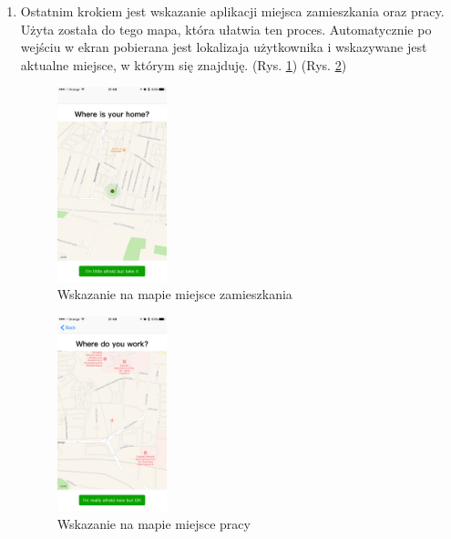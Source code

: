 \documentclass[a4paper,11pt]{article}
\begin{document}
\begin{enumerate}
\item Ostatnim krokiem jest wskazanie aplikacji miejsca zamieszkania oraz pracy. Użyta została do tego mapa, która ułatwia ten proces. Automatycznie po wejściu w ekran pobierana jest lokalizaja użytkownika i wskazywane jest aktualne miejsce, w którym się znajduję. (Rys. \ref{setup5}) (Rys. \ref{setup6})
\begin{figure}[H]
	\includegraphics[width=0.3\textwidth,center]{ios-screens/setup5.png}
	\caption {Wskazanie na mapie miejsce zamieszkania}
	\label{setup5}
\end{figure}
\begin{figure}[H]
	\includegraphics[width=0.3\textwidth,center]{ios-screens/setup6.png}
	\caption {Wskazanie na mapie miejsce pracy}
	\label{setup6}
\end{figure}


\end{enumerate}
\end{document}
